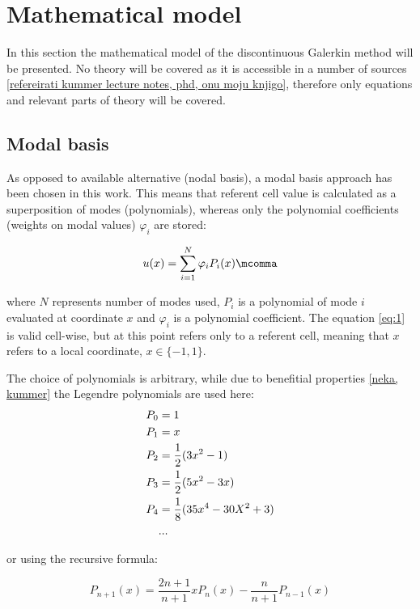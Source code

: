 \documentclass[11pt, a4paper]{article}
\begin{document}
\section{Mathematical model}
\label{sec:2}

In this section the mathematical model of the discontinuous Galerkin method will
be presented. No theory will be covered as it is accessible
in a number of sources \ref{refereirati kummer lecture notes, phd, onu moju
knjigo}, therefore only equations and relevant parts of theory will be covered.



\subsection{Modal basis}

As opposed to available alternative (nodal basis), a modal basis approach has
been chosen in this work. This means that referent cell value is calculated
as a superposition of modes (polynomials), whereas only the polynomial
coefficients (weights on modal values) $\varphi_i$ are stored:

\begin{equation}
    u(x) = \sum_{i=1}^N \varphi_i P_i(x) \mcomma
    \label{eq:1}
\end{equation}

\noindent where $N$ represents number of modes used, $P_i$ is a polynomial of
mode $i$ evaluated at coordinate $x$ and $\varphi_i$ is a polynomial coefficient. The
equation \eqref{eq:1} is valid cell-wise, but at this point refers only to a
referent cell, meaning that $x$ refers to a local coordinate, $x\in\{-1,1\}$.

The choice of polynomials is arbitrary, while due to benefitial properties
\ref{neka, kummer} the Legendre polynomials are used here:
%
\begin{align}
    P_0 &= 1\notag\\
    P_1 &= x\notag\\
    P_2 &= \dfrac{1}{2}(3x^2 - 1)\\
    P_3 &= \dfrac{1}{2}(5x^2 - 3x)\notag\\
    P_4 &= \dfrac{1}{8}(35x^4 - 30X^2 + 3)\notag\\
    &...\notag
\label{eq:2}
\end{align}

or using the recursive formula:

\begin{equation}
    P_{n+1}(x) = \dfrac{2n+1}{n+1}xP_n(x) - \dfrac{n}{n+1} P_{n-1}(x)
    \label{eq:3}
\end{equation}
\end{document}

